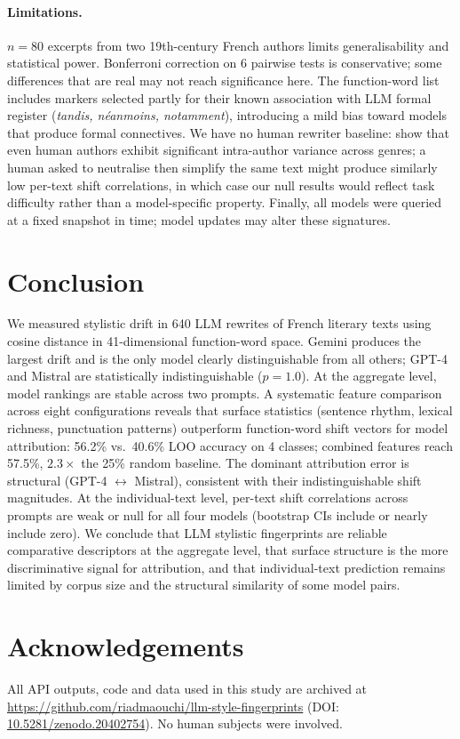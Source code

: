 \documentclass[11pt,a4paper]{article}
\begin{document}
\paragraph{Limitations.}
$n = 80$ excerpts from two 19th-century French authors limits
generalisability and statistical power.
Bonferroni correction on 6 pairwise tests is conservative;
some differences that are real may not reach significance here.
The function-word list includes markers selected partly for
their known association with LLM formal register
(\textit{tandis, néanmoins, notamment}),
introducing a mild bias toward models that produce formal connectives.
We have no human rewriter baseline: \citet{koppel2009} show that
even human authors exhibit significant intra-author variance across
genres; a human asked to neutralise then simplify the same text
might produce similarly low per-text shift correlations, in which case
our null results would reflect task difficulty rather than a
model-specific property.
Finally, all models were queried at a fixed snapshot in time;
model updates may alter these signatures.

\section{Conclusion}

We measured stylistic drift in 640 LLM rewrites of French literary texts
using cosine distance in 41-dimensional function-word space.
Gemini produces the largest drift and is the only model clearly
distinguishable from all others; GPT-4 and Mistral are statistically
indistinguishable ($p = 1.0$).
At the aggregate level, model rankings are stable across two prompts.
A systematic feature comparison across eight configurations reveals
that surface statistics (sentence rhythm, lexical richness, punctuation
patterns) outperform function-word shift vectors for model attribution:
56.2\% vs.\ 40.6\% LOO accuracy on 4 classes; combined features
reach 57.5\%, $2.3\times$ the 25\% random baseline.
The dominant attribution error is structural (GPT-4 $\leftrightarrow$
Mistral), consistent with their indistinguishable shift magnitudes.
At the individual-text level, per-text shift correlations across prompts
are weak or null for all four models (bootstrap CIs include or nearly
include zero).
We conclude that LLM stylistic fingerprints are reliable comparative
descriptors at the aggregate level, that surface structure is the
more discriminative signal for attribution, and that individual-text
prediction remains limited by corpus size and the structural similarity
of some model pairs.

\section*{Acknowledgements}
All API outputs, code and data used in this study are archived at
\url{https://github.com/riadmaouchi/llm-style-fingerprints}
(DOI: \href{https://doi.org/10.5281/zenodo.20402754}{10.5281/zenodo.20402754}).
No human subjects were involved.


\end{document}
